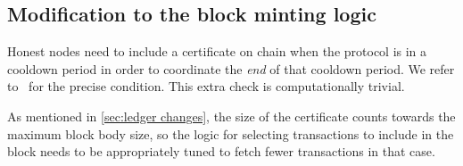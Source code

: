 \subsection{Modification to the block minting logic}\label{sec:modified block mint}

Honest nodes need to include a certificate on chain when the protocol is in a cooldown period in order to coordinate the \emph{end} of that cooldown period.
We refer to~\cite[Block creation]{peras-cip} for the precise condition.
This extra check is computationally trivial.

As mentioned in \cref{sec:ledger changes}, the size of the certificate counts towards the maximum block body size, so the logic for selecting transactions to include in the block needs to be appropriately tuned to fetch fewer transactions in that case.


